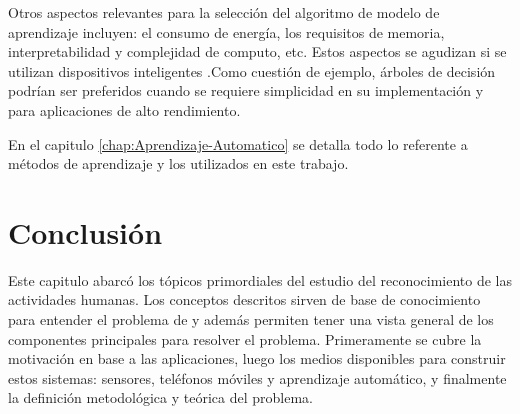 Otros aspectos relevantes para la selección del algoritmo de modelo
de aprendizaje incluyen: el consumo de energía, los requisitos de
memoria, interpretabilidad y complejidad de computo, etc. Estos aspectos
se agudizan si se utilizan dispositivos inteligentes .Como cuestión
de ejemplo, árboles de decisión podrían ser preferidos cuando se requiere
simplicidad en su implementación y  para aplicaciones de
alto rendimiento\cite{ReyesOrtiz2015}.

En el capitulo \ref{chap:Aprendizaje-Automatico} se detalla todo
lo referente a métodos de aprendizaje y los utilizados en este trabajo.

\section{Conclusión}

\label{sec27:conclusion}Este capitulo abarcó los tópicos primordiales
del estudio del reconocimiento de las actividades humanas. Los conceptos
descritos sirven de base de conocimiento para entender el problema
de  y además permiten tener una vista general de los componentes
principales para resolver el problema. Primeramente se cubre la motivación
en base a las aplicaciones, luego los medios disponibles para construir
estos sistemas: sensores, teléfonos móviles y aprendizaje automático,
y finalmente la definición metodológica y teórica del problema. 
